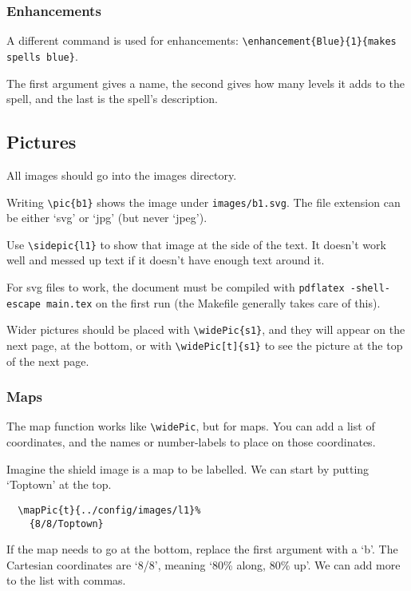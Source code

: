 \documentclass[a4paper,openany]{book}
\begin{document}
\begin{multicols}{2}
\subsubsection{Enhancements}
A different command is used for enhancements: \verb"\enhancement{Blue}{1}{makes spells blue}".

The first argument gives a name, the second gives how many levels it adds to the spell, and the last is the spell's description.

\subsection{Pictures}

All images should go into the images directory.

Writing \verb"\pic{b1}" shows the image under \verb"images/b1.svg".
The file extension can be either `svg' or `jpg' (but never `jpeg').

Use \verb"\sidepic{l1}" to show that image at the side of the text.
It doesn't work well and messed up text if it doesn't have enough text around it.


For svg files to work, the document must be compiled with \verb"pdflatex -shell-escape main.tex" on the first run (the Makefile generally takes care of this).

Wider pictures should be placed with \verb"\widePic{s1}", and they will appear on the next page, at the bottom, or with \verb"\widePic[t]{s1}" to see the picture at the top of the next page.


\subsubsection{Maps}

The map function works like \verb"\widePic", but for maps.
You can add a list of coordinates, and the names or number-labels to place on those coordinates.


Imagine the shield image is a map to be labelled.
We can start by putting `Toptown' at the top.

\begin{verbatim}
  \mapPic{t}{../config/images/l1}%
    {8/8/Toptown}
\end{verbatim}

If the map needs to go at the bottom, replace the first argument with a `b'.
The Cartesian coordinates are `8/8', meaning `80\% along, 80\% up'.
We can add more to the list with commas.


\end{multicols}
\end{document}
